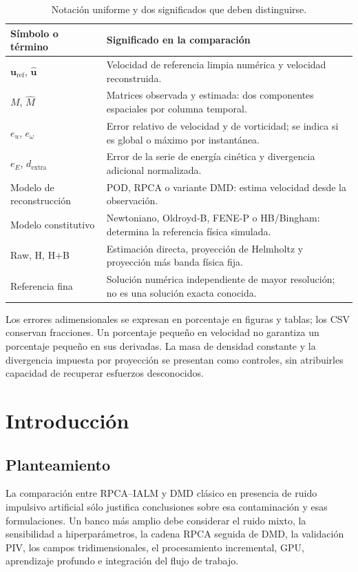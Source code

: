\documentclass[11pt,oneside,openany]{book}
\newcommand{\uref}{\boldsymbol u_{\mathrm{ref}}}
\newcommand{\uhat}{\widehat{\boldsymbol u}}
\begin{document}
\begin{table}[htbp]\centering\small
\caption*{Notación uniforme y dos significados que deben distinguirse.}
\begin{tabularx}{\textwidth}{@{}p{3.1cm}X@{}}\toprule
Símbolo o término & Significado en la comparación\\\midrule
$\uref$, $\uhat$ & Velocidad de referencia limpia numérica y velocidad reconstruida.\\
$M$, $\widehat M$ & Matrices observada y estimada: dos componentes espaciales por columna temporal.\\
$e_u$, $e_\omega$ & Error relativo de velocidad y de vorticidad; se indica si es global o máximo por instantánea.\\
$e_E$, $d_{\mathrm{extra}}$ & Error de la serie de energía cinética y divergencia adicional normalizada.\\
Modelo de reconstrucción & POD, RPCA o variante DMD: estima velocidad desde la observación.\\
Modelo constitutivo & Newtoniano, Oldroyd-B, FENE-P o HB/Bingham: determina la referencia física simulada.\\
Raw, H, H+B & Estimación directa, proyección de Helmholtz y proyección más banda física fija.\\
Referencia fina & Solución numérica independiente de mayor resolución; no es una solución exacta conocida.\\
\bottomrule\end{tabularx}\end{table}

Los errores adimensionales se expresan en porcentaje en figuras y tablas;
los CSV conservan fracciones. Un porcentaje pequeño en velocidad no garantiza
un porcentaje pequeño en sus derivadas. La masa de densidad constante y la
divergencia impuesta por proyección se presentan como controles, sin atribuirles
capacidad de recuperar esfuerzos desconocidos.

\tableofcontents
\listoffigures
\mainmatter

\chapter{Introducción}
\section{Planteamiento}
La comparación entre RPCA--IALM y DMD clásico en presencia de ruido
impulsivo artificial sólo justifica conclusiones sobre esa contaminación y
esas formulaciones. Un banco más amplio debe considerar
el ruido mixto, la sensibilidad a hiperparámetros, la cadena RPCA seguida de
DMD, la validación PIV, los campos tridimensionales, el procesamiento
incremental, GPU, aprendizaje profundo e integración del flujo de trabajo.
\end{document}
